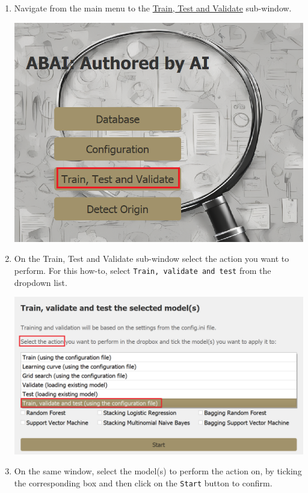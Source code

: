 \begin{enumerate}
\begin{center}
    \end{center}
    \item Navigate from the main menu to the \hyperref[subsubsec:train-test-validate]{Train, Test and Validate} sub-window.
    \begin{center}
        \includegraphics[width=14cm]{Images/Usage/Demo/train-test-validate.png}
    \end{center}
    \item On the Train, Test and Validate sub-window select the action you want to perform. For this how-to, select \texttt{Train, validate and test} from the dropdown list.
    \begin{center}
        \includegraphics[width=14cm]{Images/Usage/Demo/train-select.png}
    \end{center}
    \clearpage
    \item On the same window, select the model(s) to perform the action on, by ticking the corresponding box and then click on the \texttt{Start} button to confirm. 

\end{enumerate}

